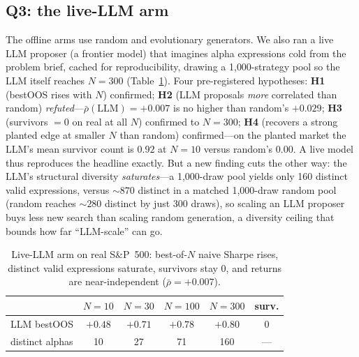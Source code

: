 \documentclass[sigconf,review,anonymous]{acmart}
\begin{document}
\subsection{Q3: the live-LLM arm}
The offline arms use random and evolutionary generators. We also ran a live LLM proposer (a frontier model) that imagines alpha expressions cold from the problem brief, cached for reproducibility, drawing a 1{,}000-strategy pool so the LLM itself reaches $N{=}300$ (Table~\ref{tab:llm}). Four pre-registered hypotheses: \textbf{H1} (bestOOS rises with $N$) confirmed; \textbf{H2} (LLM proposals \emph{more} correlated than random) \emph{refuted}---$\bar\rho(\text{LLM}){=}{+}0.007$ is no higher than random's $+0.029$; \textbf{H3} (survivors $=0$ on real at all $N$) confirmed to $N{=}300$; \textbf{H4} (recovers a strong planted edge at smaller $N$ than random) confirmed---on the planted market the LLM's mean survivor count is $0.92$ at $N{=}10$ versus random's $0.00$. A live model thus reproduces the headline exactly. But a new finding cuts the other way: the LLM's structural diversity \emph{saturates}---a 1{,}000-draw pool yields only 160 distinct valid expressions, versus ${\sim}870$ distinct in a matched 1{,}000-draw random pool (random reaches ${\sim}280$ distinct by just 300 draws), so scaling an LLM proposer buys less new search than scaling random generation, a diversity ceiling that bounds how far ``LLM-scale'' can go.

\begin{table}[t]
\caption{Live-LLM arm on real S\&P~500: best-of-$N$ naive Sharpe rises, distinct valid expressions saturate, survivors stay 0, and returns are near-independent ($\bar\rho{=}{+}0.007$).}
\label{tab:llm}
\small
\begin{tabular}{@{}lccccc@{}}
\toprule
& $N{=}10$ & $N{=}30$ & $N{=}100$ & $N{=}300$ & surv. \\
\midrule
LLM bestOOS & $+0.48$ & $+0.71$ & $+0.78$ & $+0.80$ & 0 \\
distinct alphas & 10 & 27 & 71 & 160 & --- \\
\bottomrule
\end{tabular}
\end{table}
\end{document}
